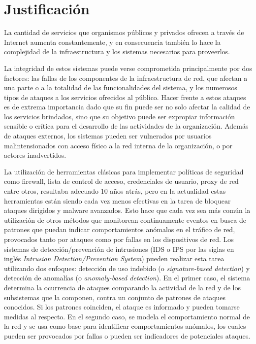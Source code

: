 \section*{Justificación}
La cantidad de servicios que organismos públicos y privados ofrecen a través de Internet aumenta constantemente, y en consecuencia también lo hace la complejidad de la infraestructura y los sistemas necesarios para proveerlos. \par
La integridad de estos sistemas puede verse comprometida principalmente por dos factores: las fallas de los componentes de la infraestructura de red\cite{Gill:2011:UNF:2043164.2018477}, que afectan a una parte o a la totalidad de las funcionalidades del sistema, y los numerosos tipos de ataques\cite{Karumanchi:2014:WLS:2554850.2555010}\cite{mutchler15:mobilewebapps} a los servicios ofrecidos al público. Hacer frente a estos ataques es de extrema importancia dado que su fin puede ser no solo afectar la calidad de los servicios brindados, sino que su objetivo puede ser expropiar información sensible o crítica para el desarrollo de las actividades de la organización. Además de ataques externos, los sistemas pueden ser vulnerados por usuarios malintensionados con acceso físico a la red interna de la organización, o por actores inadvertidos\cite{Kraemer2007143}\cite{Kraemer2009509}\cite{Liginlal2009215}\cite{Ahmed12humanerrors}. \par
La utilización de herramientas clásicas para implementar políticas de seguridad como firewall, lista de control de acceso, credenciales de usuario, proxy de red entre otros, resultaba adecuado 10 años atrás, pero en la actualidad estas herramientas están siendo cada vez menos efectivas en la tarea de bloquear ataques dirigidos y malware avanzados. Esto hace que cada vez sea más común la utilización de otros métodos que monitorean continuamente eventos en busca de patrones que puedan indicar comportamientos anómalos en el tráfico de red, provocados tanto por ataques como por fallas en los dispositivos de red. Los sistemas de detección/prevención de intrusiones (IDS o IPS por las siglas en inglés \textit{Intrusion Detection/Prevention System}) pueden realizar esta tarea utilizando dos enfoques: detección de uso indebido (o \textit{signature-based detection}) y detección de anomalías (o \textit{anomaly-based detection})\cite{Milenkoski:2015:ECI:2808687.2808691}. En el primer caso, el sistema determina la ocurrencia de ataques comparando la actividad de la red y de los subsistemas que la componen, contra un conjunto de patrones de ataques conocidos. Si los patrones coinciden, el ataque es informado y pueden tomarse medidas al respecto. En el segundo caso, se modela el comportamiento normal de la red y se usa como base para identificar comportamientos anómalos, los cuales pueden ser provocados por fallas o pueden ser indicadores de potenciales ataques. \par
